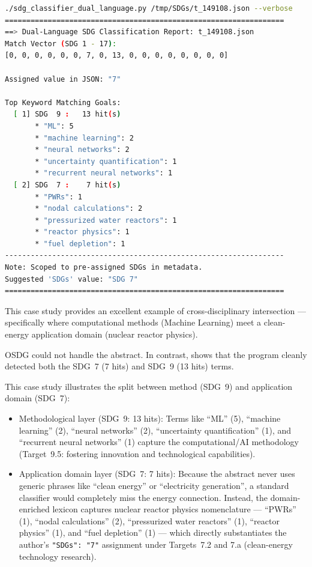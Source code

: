 \begin{casestudySection}
\begin{lstlisting}[language={bash}, basicstyle=\footnotesize, escapechar=|, breaklines=true,
    postbreak=\usebox{\lstbreakbox}, caption={Program's output}, label=lst:t_149108Output]
./sdg_classifier_dual_language.py /tmp/SDGs/t_149108.json --verbose
=================================================================
==> Dual-Language SDG Classification Report: t_149108.json
Match Vector (SDG 1 - 17):
[0, 0, 0, 0, 0, 0, 7, 0, 13, 0, 0, 0, 0, 0, 0, 0, 0]

Assigned value in JSON: "7"

Top Keyword Matching Goals:
  [ 1] SDG  9 :   13 hit(s)
       * "ML": 5
       * "machine learning": 2
       * "neural networks": 2
       * "uncertainty quantification": 1
       * "recurrent neural networks": 1
  [ 2] SDG  7 :    7 hit(s)
       * "PWRs": 1
       * "nodal calculations": 2
       * "pressurized water reactors": 1
       * "reactor physics": 1
       * "fuel depletion": 1
-----------------------------------------------------------------
Note: Scoped to pre-assigned SDGs in metadata.
Suggested 'SDGs' value: "SDG 7"
=================================================================
\end{lstlisting}

This case study provides an excellent example of cross-disciplinary intersection --- specifically where computational methods (Machine Learning) meet a clean-energy application domain (nuclear reactor physics).

OSDG could not handle the abstract. In contrast,  shows that the program cleanly detected both the \gls{SDG}~7 (\num{7} hits) and \gls{SDG}~9 (\num{13} hits) terms.

This case study illustrates the split between method (\gls{SDG}~9) and application domain (\gls{SDG}~7):
\begin{itemize}
    \item Methodological layer (\gls{SDG}~9: \num{13} hits): Terms like \enquote{ML} (5), \enquote{machine learning} (2), \enquote{neural networks} (2), \enquote{uncertainty quantification} (1), and \enquote{recurrent neural networks} (1) capture the computational/AI methodology (Target~9.5: fostering innovation and technological capabilities).

    \item Application domain layer (\gls{SDG}~7: \num{7} hits): Because the abstract never uses generic phrases like \enquote{clean energy} or \enquote{electricity generation}, a standard classifier would completely miss the energy connection. Instead, the domain-enriched lexicon captures nuclear reactor physics nomenclature --- \enquote{PWRs} (1), \enquote{nodal calculations} (2), \enquote{pressurized water reactors} (1), \enquote{reactor physics} (1), and \enquote{fuel depletion} (1) --- which directly substantiates the author's \texttt{"SDGs": "7"} assignment under Targets~7.2 and 7.a (clean-energy technology research).
\end{itemize}


\end{casestudySection}

